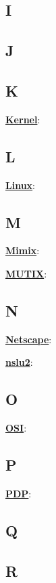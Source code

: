 \subsection*{I}

\subsection*{J}

\subsection*{K}

\underline{\textbf{Kernel}}: %

\subsection*{L}

\underline{\textbf{Linux}}: %

\subsection*{M}

\underline{\textbf{Mimix}}: %

\underline{\textbf{MUTIX}}: %

\subsection*{N}

\underline{\textbf{Netscape}}: %

\underline{\textbf{nslu2}}: %

\subsection*{O}

\underline{\textbf{OSI}}: %

\subsection*{P}

\underline{\textbf{PDP}}: %

\subsection*{Q}

\subsection*{R}

